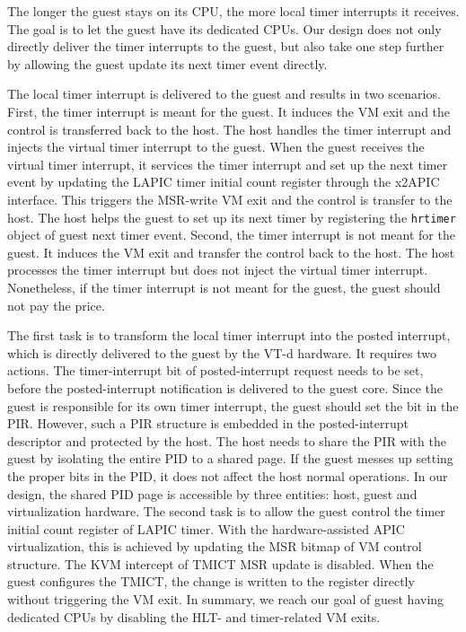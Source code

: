 The longer the guest stays on its CPU, the more local timer
interrupts it receives. The goal is to let the guest have its
dedicated CPUs. Our design does not only directly deliver the
timer interrupts to the guest, but also take one step further
by allowing the guest update its next timer event directly.

The local timer interrupt is delivered to the guest and
results in two scenarios. First, the timer interrupt is meant
for the guest. It induces the VM exit and the control is
transferred back to the host. The host handles the timer
interrupt and injects the virtual timer interrupt to the
guest. When the guest receives the virtual timer interrupt, it
services the timer interrupt and set up the next timer event
by updating the LAPIC timer initial count register through the
x2APIC interface. This triggers the MSR-write VM exit and the
control is transfer to the host. The host helps the guest to
set up its next timer by registering the \texttt{hrtimer}
object of guest next timer event. Second, the timer interrupt
is not meant for the guest. It induces the VM exit and
transfer the control back to the host. The host processes the
timer interrupt but does not inject the virtual timer
interrupt. Nonetheless, if the timer interrupt is not meant
for the guest, the guest should not pay the price.

The first task is to transform the local timer interrupt into
the posted interrupt, which is directly delivered to the guest
by the VT-d hardware. It requires two actions. The
timer-interrupt bit of posted-interrupt request needs to be
set, before the posted-interrupt notification is delivered to
the guest core. Since the guest is responsible for its own
timer interrupt, the guest should set the bit in the PIR.
However, such a PIR structure is embedded in the
posted-interrupt descriptor and protected by the host. The
host needs to share the PIR with the guest by isolating the
entire PID to a shared page. If the guest messes up setting
the proper bits in the PID, it does not affect the host normal
operations. In our design, the shared PID page is accessible
by three entities: host, guest and virtualization hardware.
The second task is to allow the guest control the timer
initial count register of LAPIC timer. With the
hardware-assisted APIC virtualization, this is achieved by
updating the MSR bitmap of VM control structure. The KVM
intercept of TMICT MSR update is disabled. When the guest
configures the TMICT, the change is written to the register
directly without triggering the VM exit. In summary, we reach
our goal of guest having dedicated CPUs by disabling the HLT-
and timer-related VM exits.

